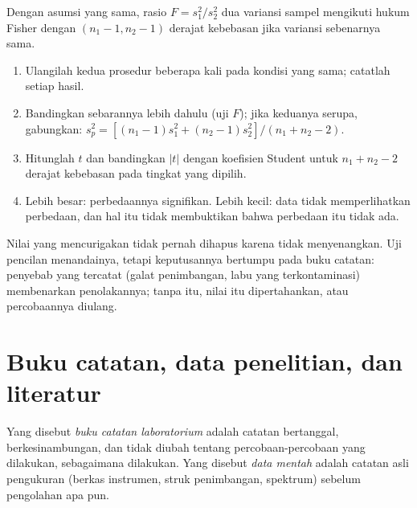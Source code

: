 \begin{proposition}[Uji $F$]\label{prop:b3:lab-techniques-3:f-test}
Dengan asumsi yang sama, rasio $F = s_1^2/s_2^2$ dua variansi sampel mengikuti
hukum Fisher dengan $(n_1 - 1, n_2 - 1)$ derajat kebebasan jika variansi sebenarnya sama.
\admitted
\end{proposition}

\begin{method}\label{met:b3:lab-techniques-3:compare-means}
\begin{enumerate}
  \item Ulangilah kedua prosedur beberapa kali pada kondisi yang sama; catatlah
        setiap hasil.
  \item Bandingkan sebarannya lebih dahulu (uji $F$); jika keduanya serupa, gabungkan:
        $s_p^2 = [(n_1 - 1)s_1^2 + (n_2 - 1)s_2^2]/(n_1 + n_2 - 2)$.
  \item Hitunglah $t$ dan bandingkan $|t|$ dengan koefisien Student untuk $n_1 + n_2 - 2$ derajat
        kebebasan pada tingkat yang dipilih.
  \item Lebih besar: perbedaannya signifikan. Lebih kecil: data tidak memperlihatkan perbedaan,
        dan hal itu tidak membuktikan bahwa perbedaan itu tidak ada.
\end{enumerate}
\end{method}

Nilai yang mencurigakan tidak pernah dihapus karena tidak menyenangkan. Uji pencilan
menandainya, tetapi keputusannya bertumpu pada buku catatan: penyebab yang tercatat (galat
penimbangan, labu yang terkontaminasi) membenarkan penolakannya; tanpa itu, nilai itu dipertahankan,
atau percobaannya diulang.

\section{Buku catatan, data penelitian, dan literatur}

\begin{definition}\label{def:b3:lab-techniques-3:notebook}
Yang disebut \emph{buku catatan laboratorium} adalah catatan bertanggal,
berkesinambungan, dan tidak diubah tentang percobaan-percobaan yang dilakukan, sebagaimana dilakukan. Yang disebut \emph{data
mentah} adalah catatan asli pengukuran (berkas
instrumen, struk penimbangan, spektrum) sebelum pengolahan apa pun.
\end{definition}


